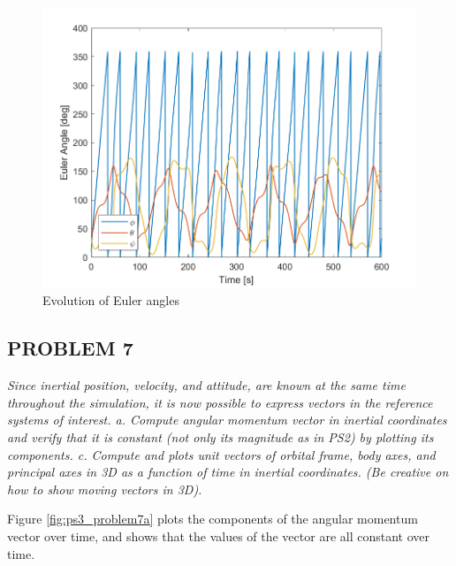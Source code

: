 \begin{figure}[H]
\centering
\includegraphics[scale=0.6]{Images/ps3_problem6_euler.png}
\caption{Evolution of Euler angles}
\label{fig:ps3_problem6_euler}
\end{figure}

\subsection{PROBLEM 7}
\textit{Since inertial position, velocity, and attitude, are known at the same time throughout the simulation, it is now possible to express vectors in the reference systems of interest.
a. Compute angular momentum vector in inertial coordinates and verify that it is constant (not only its magnitude as in PS2) by plotting its components.
c. Compute and plots unit vectors of orbital frame, body axes, and principal axes in 3D as a function of time in inertial coordinates. (Be creative on how to show moving vectors in 3D).
}

Figure \ref{fig:ps3_problem7a} plots the components of the angular momentum vector over time, and shows that the values of the vector are all constant over time.

